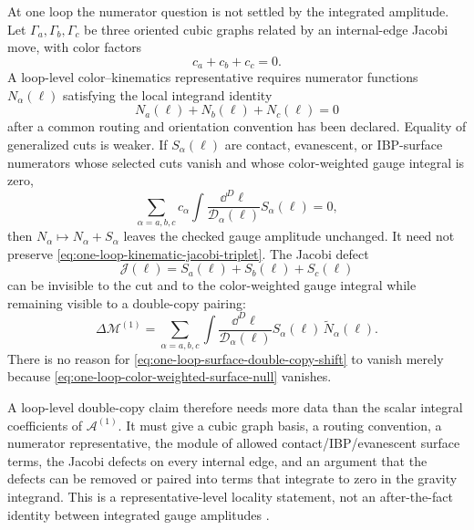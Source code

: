 \begin{controlledapproximation}
\label{ca:loop-level-color-kinematics-surface-obstruction}
At one loop the numerator question is not settled by the integrated amplitude.
Let \(\Gamma_a,\Gamma_b,\Gamma_c\) be three oriented cubic graphs related by an
internal-edge Jacobi move, with color factors
\begin{equation}
  c_a+c_b+c_c=0 .
  \label{eq:one-loop-color-jacobi-triplet}
\end{equation}
A loop-level color--kinematics representative requires numerator functions
\(N_\alpha(\ell)\) satisfying the local integrand identity
\begin{equation}
  N_a(\ell)+N_b(\ell)+N_c(\ell)=0
  \label{eq:one-loop-kinematic-jacobi-triplet}
\end{equation}
after a common routing and orientation convention has been declared.  Equality
of generalized cuts is weaker.  If \(S_\alpha(\ell)\) are contact, evanescent,
or IBP-surface numerators whose selected cuts vanish and whose color-weighted
gauge integral is zero,
\begin{equation}
  \sum_{\alpha=a,b,c}
  c_\alpha
  \int
  \frac{\dd^D\ell}{\mathcal D_\alpha(\ell)}
  S_\alpha(\ell)
  =
  0,
  \label{eq:one-loop-color-weighted-surface-null}
\end{equation}
then \(N_\alpha\mapsto N_\alpha+S_\alpha\) leaves the checked gauge amplitude
unchanged.  It need not preserve
\eqref{eq:one-loop-kinematic-jacobi-triplet}.  The Jacobi defect
\begin{equation}
  \mathcal J(\ell)
  =
  S_a(\ell)+S_b(\ell)+S_c(\ell)
  \label{eq:one-loop-surface-jacobi-defect}
\end{equation}
can be invisible to the cut and to the color-weighted gauge integral while
remaining visible to a double-copy pairing:
\begin{equation}
  \Delta\mathcal M^{(1)}
  =
  \sum_{\alpha=a,b,c}
  \int
  \frac{\dd^D\ell}{\mathcal D_\alpha(\ell)}
  S_\alpha(\ell)\,\widetilde N_\alpha(\ell).
  \label{eq:one-loop-surface-double-copy-shift}
\end{equation}
There is no reason for
\eqref{eq:one-loop-surface-double-copy-shift} to vanish merely because
\eqref{eq:one-loop-color-weighted-surface-null} vanishes.

A loop-level double-copy claim therefore needs more data than the scalar
integral coefficients of \(\mathcal A^{(1)}\).  It must give a cubic graph
basis, a routing convention, a numerator representative, the module of
allowed contact/IBP/evanescent surface terms, the Jacobi defects on every
internal edge, and an argument that the defects can be removed or paired into
terms that integrate to zero in the gravity integrand.  This is a
representative-level locality statement, not an after-the-fact identity between
integrated gauge amplitudes
\cite{BernCarrascoJohansson2010PerturbativeQuantumGravity}.
\end{controlledapproximation}

